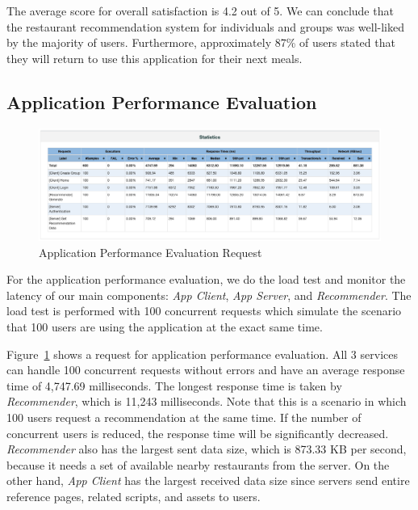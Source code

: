 \documentclass[12pt,oneside,openright,a4paper]{cpe-english-project}
\begin{document}
The average score for overall satisfaction is 4.2 out of 5. We can conclude that the restaurant recommendation system for individuals and groups was well-liked by the majority of users. Furthermore, approximately 87\% of users stated that they will return to use this application for their next meals.

\subsection{Application Performance Evaluation}

\begin{figure}[H]\centering
\includegraphics[width=350pt]{./images/4ApplicationPerformanceEvaluationRequest.png}
\caption{Application Performance Evaluation Request}\label{fig:4ApplicationPerformanceEvaluationRequest}
\end{figure}\vspace{-24pt}

For the application performance evaluation, we do the load test and monitor the latency of our main components: \textit{App Client}, \textit{App Server}, and \textit{Recommender}. The load test is performed with 100 concurrent requests which simulate the scenario that 100 users are using the application at the exact same time.

Figure~\ref{fig:4ApplicationPerformanceEvaluationRequest} shows a request for application performance evaluation. All 3 services can handle 100 concurrent requests without errors and have an average response time of 4,747.69 milliseconds. The longest response time is taken by \textit{Recommender}, which is 11,243 milliseconds. Note that this is a scenario in which 100 users request a recommendation at the same time. If the number of concurrent users is reduced, the response time will be significantly decreased. \textit{Recommender} also has the largest sent data size, which is 873.33 KB per second, because it needs a set of available nearby restaurants from the server. On the other hand, \textit{App Client} has the largest received data size since servers send entire reference pages, related scripts, and assets to users.
\end{document}
